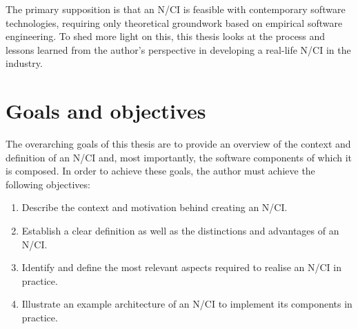 The primary supposition is that an N/CI is feasible with contemporary software technologies, requiring only theoretical groundwork based on empirical software engineering. To shed more light on this, this thesis looks at the process and lessons learned from the author’s perspective in developing a real-life N/CI in the industry.

\section{Goals and objectives}
\label{chapter1-goals-and-objectives}

The overarching goals of this thesis are to provide an overview of the context and definition of an N/CI and, most importantly, the software components of which it is composed. In order to achieve these goals, the author must achieve the following objectives:

\begin{enumerate}
  \item Describe the context and motivation behind creating an N/CI.
  \item Establish a clear definition as well as the distinctions and advantages of an N/CI.
  \item Identify and define the most relevant aspects required to realise an N/CI in practice.
  \item Illustrate an example architecture of an N/CI to implement its components in practice.
\end{enumerate}

